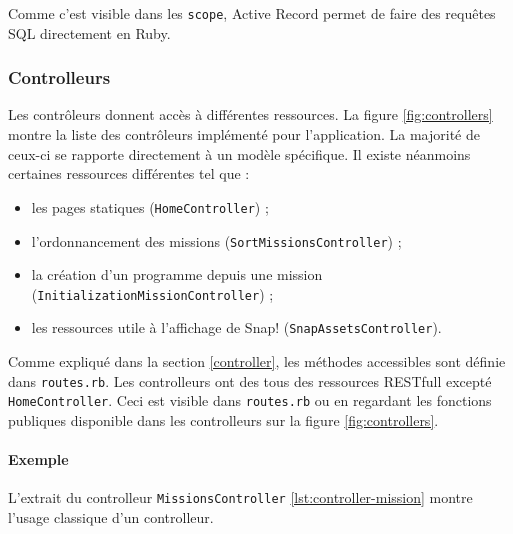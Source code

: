 Comme c'est visible dans les \texttt{scope}, Active Record permet de faire des requêtes SQL directement en Ruby. 
%

\subsubsection{Controlleurs}
Les contrôleurs donnent accès à différentes ressources. La figure \ref{fig:controllers} montre la liste des contrôleurs implémenté pour l'application. La majorité de ceux-ci se rapporte directement à un modèle spécifique. Il existe néanmoins certaines ressources différentes tel que : 
\begin{itemize}
  \item les pages statiques (\texttt{HomeController}) ;
  \item l'ordonnancement des missions (\texttt{SortMissionsController}) ; 
  \item la création d'un programme depuis une mission (\texttt{InitializationMissionController}) ;
  \item les ressources utile à l'affichage de Snap! (\texttt{SnapAssetsController}).
\end{itemize}

Comme expliqué dans la section \ref{controller}, les méthodes accessibles sont définie dans \texttt{routes.rb}. Les controlleurs ont des tous des ressources RESTfull excepté \texttt{HomeController}. Ceci est visible dans \texttt{routes.rb} ou en regardant les fonctions publiques disponible dans les controlleurs sur la figure \ref{fig:controllers}.

\paragraph{Exemple}
L'extrait du controlleur \texttt{MissionsController} \ref{lst:controller-mission} montre l'usage classique d'un controlleur. 

%

